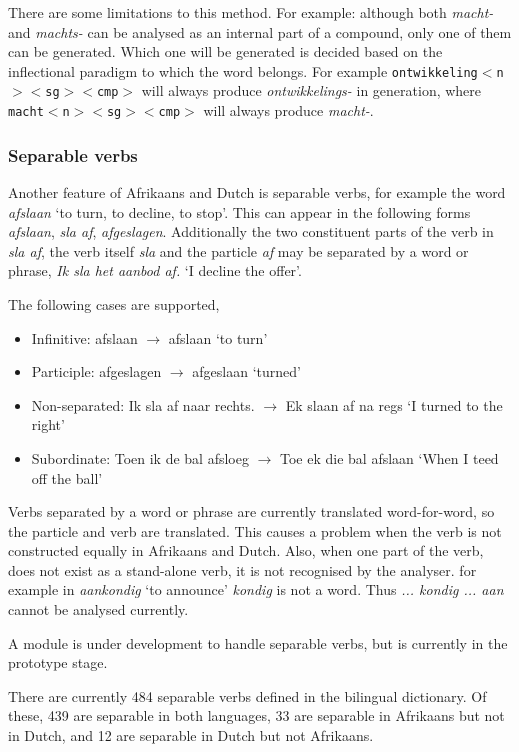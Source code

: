 \documentclass[11pt]{article}
\begin{document}
There are some limitations to this method. For example: although
both {\em macht-} and {\em machts-} can be analysed as an internal part
of a compound, only one of them can be generated. Which one will be generated
is decided based on the inflectional paradigm to which the word belongs. For
example {\small {\tt ontwikkeling$<$n$><$sg$><$cmp$>$}} will always produce {\em ontwikkelings-} in generation,
where {\small {\tt macht$<$n$><$sg$><$cmp$>$}} will always produce {\em macht-}.

\subsubsection{Separable verbs}

Another feature of Afrikaans and Dutch is separable verbs, for example
the word {\em afslaan} `to turn, to decline, to stop'. This can appear in the following
forms {\em afslaan}, {\em sla af}, {\em afgeslagen}. Additionally the two constituent
parts of the verb in {\em sla af}, the verb itself {\em sla} and the particle
{\em af} may be separated by a word or phrase, {\em Ik sla het aanbod af.}
 `I decline the offer'.

The following cases are supported,

\begin{itemize}
\item Infinitive: afslaan $\rightarrow$ afslaan `to turn'
\item Participle: afgeslagen $\rightarrow$ afgeslaan `turned'
\item Non-separated: Ik sla af naar rechts. $\rightarrow$ Ek slaan af na regs `I turned to the right' 
\item Subordinate: Toen ik de bal afsloeg $\rightarrow$ Toe ek die bal afslaan `When I teed off the ball'
\end{itemize}

Verbs separated by a word or phrase are currently translated word-for-word,
so the particle and verb are translated. This causes a problem when the
verb is not constructed equally in Afrikaans and Dutch. Also, when one part
of the verb, does not exist as a stand-alone verb, it is not recognised by the analyser.
for example in {\em aankondig} `to announce' {\em kondig} is not a word. Thus {\em ... kondig ... aan} 
cannot be analysed currently.

A module is under development to handle separable verbs, but is currently
in the prototype stage.

There are currently 484 separable verbs defined in the bilingual
dictionary. Of these, 439 are separable in both languages, 33 are
separable in Afrikaans but not in Dutch, and 12 are separable in
Dutch but not Afrikaans.
\end{document}
